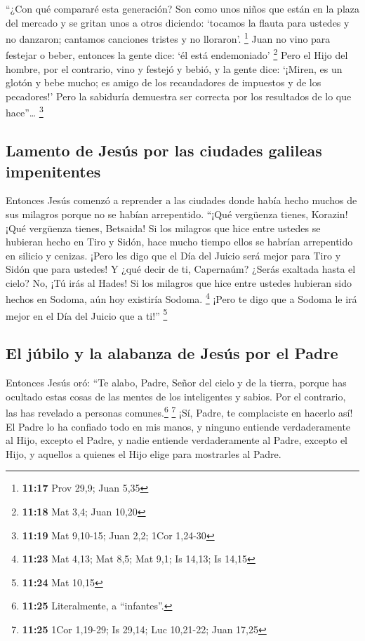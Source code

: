  ``¿Con qué compararé esta generación? Son como unos
niños que están en la plaza del mercado y se gritan unos a otros
diciendo:  `tocamos la flauta para ustedes y no danzaron;
cantamos canciones tristes y no lloraron'. \footnote{\textbf{11:17} Prov
  29,9; Juan 5,35}  Juan no vino para festejar o beber,
entonces la gente dice: `él está endemoniado' \footnote{\textbf{11:18}
  Mat 3,4; Juan 10,20}  Pero el Hijo del hombre, por el
contrario, vino y festejó y bebió, y la gente dice: `¡Miren, es un
glotón y bebe mucho; es amigo de los recaudadores de impuestos y de los
pecadores!' Pero la sabiduría demuestra ser correcta por los resultados
de lo que hace''\ldots{} \footnote{\textbf{11:19} Mat 9,10-15; Juan 2,2;
  1Cor 1,24-30}

\hypertarget{lamento-de-jesuxfas-por-las-ciudades-galileas-impenitentes}{%
\subsection{Lamento de Jesús por las ciudades galileas
impenitentes}\label{lamento-de-jesuxfas-por-las-ciudades-galileas-impenitentes}}

 Entonces Jesús comenzó a reprender a las ciudades donde
había hecho muchos de sus milagros porque no se habían arrepentido.
 ``¡Qué vergüenza tienes, Korazin! ¡Qué vergüenza tienes,
Betsaida! Si los milagros que hice entre ustedes se hubieran hecho en
Tiro y Sidón, hace mucho tiempo ellos se habrían arrepentido en silicio
y cenizas.  ¡Pero les digo que el Día del Juicio será
mejor para Tiro y Sidón que para ustedes!  Y ¿qué decir
de ti, Capernaúm? ¿Serás exaltada hasta el cielo? No, ¡Tú irás al Hades!
Si los milagros que hice entre ustedes hubieran sido hechos en Sodoma,
aún hoy existiría Sodoma. \footnote{\textbf{11:23} Mat 4,13; Mat 8,5;
  Mat 9,1; Is 14,13; Is 14,15}  ¡Pero te digo que a
Sodoma le irá mejor en el Día del Juicio que a ti!'' \footnote{\textbf{11:24}
  Mat 10,15}

\hypertarget{el-juxfabilo-y-la-alabanza-de-jesuxfas-por-el-padre}{%
\subsection{El júbilo y la alabanza de Jesús por el
Padre}\label{el-juxfabilo-y-la-alabanza-de-jesuxfas-por-el-padre}}

 Entonces Jesús oró: ``Te alabo, Padre, Señor del cielo y
de la tierra, porque has ocultado estas cosas de las mentes de los
inteligentes y sabios. Por el contrario, las has revelado a personas
comunes.\footnote{\textbf{11:25} Literalmente, a ``infantes''.}
\footnote{\textbf{11:25} 1Cor 1,19-29; Is 29,14; Luc 10,21-22; Juan
  17,25}  ¡Sí, Padre, te complaciste en hacerlo así!
 El Padre lo ha confiado todo en mis manos, y ninguno
entiende verdaderamente al Hijo, excepto el Padre, y nadie entiende
verdaderamente al Padre, excepto el Hijo, y aquellos a quienes el Hijo
elige para mostrarles al Padre.

